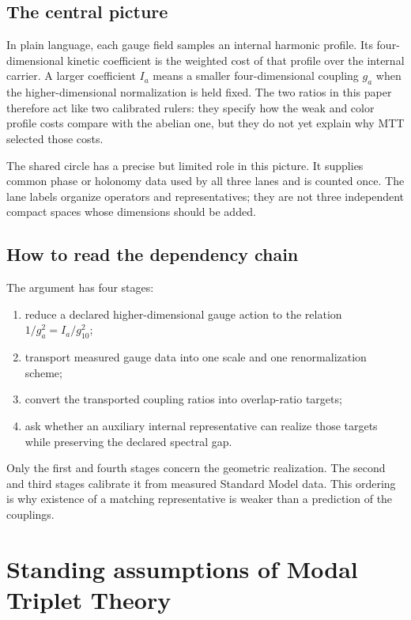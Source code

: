 \documentclass[11pt]{article}
\begin{document}
\subsection{The central picture}

In plain language, each gauge field samples an internal harmonic profile.  Its
four-dimensional kinetic coefficient is the weighted cost of that profile
over the internal carrier.  A larger coefficient $I_a$ means a smaller
four-dimensional coupling $g_a$ when the higher-dimensional normalization is
held fixed.  The two ratios in this paper therefore act like two calibrated
rulers: they specify how the weak and color profile costs compare with the
abelian one, but they do not yet explain why MTT selected those costs.

The shared circle has a precise but limited role in this picture.  It supplies
common phase or holonomy data used by all three lanes and is counted once.
The lane labels organize operators and representatives; they are not three
independent compact spaces whose dimensions should be added.

\subsection{How to read the dependency chain}

The argument has four stages:
\begin{enumerate}
\item reduce a declared higher-dimensional gauge action to the relation
  $1/g_a^2=I_a/g_{10}^2$;
\item transport measured gauge data into one scale and one renormalization
  scheme;
\item convert the transported coupling ratios into overlap-ratio targets;
\item ask whether an auxiliary internal representative can realize those
  targets while preserving the declared spectral gap.
\end{enumerate}
Only the first and fourth stages concern the geometric realization.  The
second and third stages calibrate it from measured Standard Model data.  This
ordering is why existence of a matching representative is weaker than a
prediction of the couplings.

\section{Standing assumptions of Modal Triplet Theory}
\end{document}
